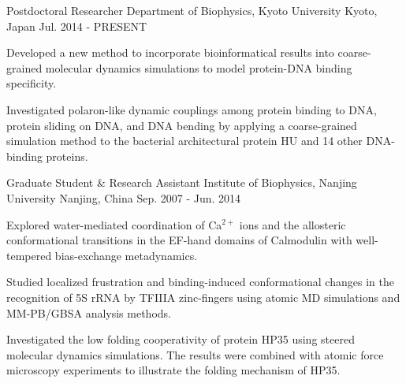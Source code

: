 

\begin{cventries}

  \cventry
  {Postdoctoral Researcher} %
  {Department of Biophysics, Kyoto University} %
  {Kyoto, Japan} %
  {Jul. 2014 - PRESENT} %
  {
    \begin{cvitems} %
    \item {Developed a new method to incorporate bioinformatical results into
        coarse-grained molecular dynamics simulations to model protein-DNA binding
        specificity.}
    \item {Investigated polaron-like dynamic couplings among protein binding to
        DNA, protein sliding on DNA, and DNA bending by applying a coarse-grained
        simulation method to the bacterial architectural protein HU and 14 other
        DNA-binding proteins.}
    \end{cvitems}
  }

  \cventry
  {Graduate Student \& Research Assistant} %
  {Institute of Biophysics, Nanjing University} %
  {Nanjing, China} %
  {Sep. 2007 - Jun. 2014} %
  {
    \begin{cvitems} %
    \item {Explored water-mediated coordination of Ca$^{2+}$ ions and the
        allosteric conformational transitions in the EF-hand domains of Calmodulin with
        well-tempered bias-exchange metadynamics.}
    \item {Studied localized frustration and binding-induced conformational
        changes in the recognition of 5S rRNA by TFIIIA zinc-fingers using atomic MD
        simulations and MM-PB/GBSA analysis methods.}
    \item {Investigated the low folding cooperativity of protein HP35 using
        steered molecular dynamics simulations.  The results were combined with atomic
        force microscopy experiments to illustrate the folding mechanism of HP35.}
    \end{cvitems}
  }


\end{cventries}
